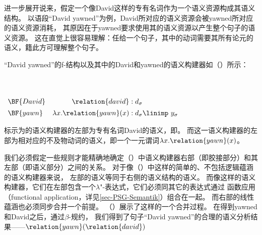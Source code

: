 进一步展开说来，假定一个像David这样的专有名词作为一个语义资源构成其语义结构。
以语段``David yawned''为例，David所对应的语义资源会被yawned所对应的语义资源消耗，
其原因在于yawned要求使用其\lfgsubj 的语义资源以产生整个句子的语义资源。
这在直觉上很容易理解：任给一个句子，其中的动词需要其所有论元的语义，籍此方可理解整个句子。
  
``David yawned''的f-结构以及其中的David和yawned的语义构建器如（）所示：

\eanoraggedright
 ~\\[-\baselineskip]
~\\[1em]
{$\begin{array}[t]{lr@{\;:\;}l}
\BF{David}&{\relation{david}}&{d_\sigma}\\*[1ex]
\BF{yawn}&{\lambda x. \relation{yawn}(x)}&{d_\sigma \linimp\ y_\sigma}
\end{array}$}
\z

\noindent 
标示为的语义构建器的左部为专有名词David的语义，即。
而\linebreak{}这一语义构建器的左部为相对应的不及物动词的语义，即一个一元谓词$\lambda x. \relation{yawn}(x)$。

我们必须假定一些规则才能精确地确定（）中语义构建器右部（即胶接部分）和其左部（即语义部分）之间的关系。
对于像（）中这样的简单的、不包括逻辑蕴涵的语义构建器来说，
左部的语义等同于右侧的语义结构的语义。
而像这样的语义构建器，它们在左部包含一个$\lambda$"-表达式，它们必须同其它的表达式通过
函数应用（functional application，详见\ref{sec-PSG-Semantik}）组合在一起。
而右部的线性蕴涵也必须同步合并一个前提。
（）展示了这样的一个合并过程。
在得到yawned和David之后，通过$\beta$-规约，
我们得到了句子``David yawned''的合理的语义分析结果——$\relation{yawn}(\relation{david})$ 

